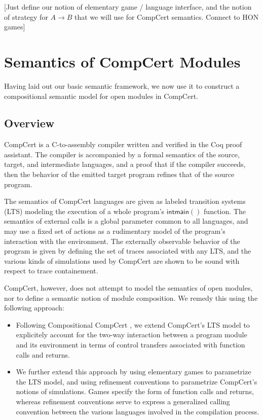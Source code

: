 \documentclass{article}
\newcommand{\kw}[1]{\ensuremath{ \mathsf{#1} }}
\begin{document}
[Just define our notion of elementary game / language interface,
and the notion of strategy for $A \rightarrow B$
that we will use for CompCert semantics.
Connect to HON games]



\section{Semantics of CompCert Modules} %


Having laid out our basic semantic framework,
we now use it to construct a compositional semantic model
for open modules in CompCert.


\subsection{Overview} %

CompCert is a C-to-assembly compiler written and verified
in the Coq proof assistant.
The compiler is accompanied by
a formal semantics of the source, target, and intermediate languages,
and a proof that if the compiler succeeds,
then the behavior of the emitted target program
refines that of the source program.

The semantics of CompCert languages
are given as labeled transition systems (LTS)
modeling the execution of a whole program's \kw{int main()} function.
The semantics of external calls
is a global parameter common to all languages,
and may use a fixed set of actions as a rudimentary model
of the program's interaction with the environment.
The externally observable behavior of the program
is given by defining the set of traces associated with any LTS,
and the various kinds of simulations used by CompCert
are shown to be sound with respect to trace containement.

CompCert, however,
does not attempt to model the semantics of open modules,
nor to define a semantic notion of module composition.
We remedy this using the following approach:
\begin{itemize}
\item Following Compositional CompCert \cite{compcompcert},
  we extend CompCert's LTS model
  to explicitely account for the two-way interaction
  between a program module and its environment
  in terms of control transfers associated with
  function calls and returns.
\item We further extend this approach by
  using elementary games to parametrize the LTS model, and
  using refinement conventions to parametrize
  CompCert's notions of simulations.
  Games specify the form of function calls and returns,
  whereas refinement conventions serve to express
  a generalized calling convention between the various
  languages involved in the compilation process.
\end{itemize}
\end{document}
